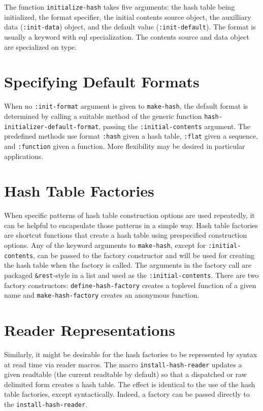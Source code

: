 \documentclass[11pt]{article}
\begin{document}
  The function \texttt{initialize-hash} takes five arguments: the hash table being
  initialized, the format specifier, the initial contents source object, the
  auxilliary data (\texttt{:init-data}) object, and the default value (\texttt{:init-default}).
  The format is usually a keyword with eql specialization. The contents
  source and data object are specialized on type.
\section{Specifying Default Formats}
\label{sec-6}


  When no \texttt{:init-format} argument is given to \texttt{make-hash}, the default format
  is determined by calling a suitable method of the generic function
  \texttt{hash-initializer-default-format}, passing the \texttt{:initial-contents} argument.
  The predefined methods use format \texttt{:hash} given a hash table, \texttt{:flat} given
  a sequence, and \texttt{:function} given a function. More flexibility may be
  desired in particular applications.
\section{Hash Table Factories}
\label{sec-7}


  When specific patterns of hash table construction options are used repeatedly,
  it can be helpful to encapsulate those patterns in a simple way.
  Hash table factories are shortcut functions that create a hash table using
  prespecified construction options. Any of the keyword arguments to \texttt{make-hash},
  except for \texttt{:initial-contents}, can be passed to the factory constructor
  and will be used for creating the hash table when the factory is called.
  The arguments in the factory call are packaged \texttt{\&rest}-style in a list
  and used as the \texttt{:initial-contents}. There are two factory constructors:
  \texttt{define-hash-factory} creates a toplevel function of a given name
  and \texttt{make-hash-factory} creates an anonymous function.
\section{Reader Representations}
\label{sec-8}


  Similarly, it might be desirable for the hash factories to be represented
  by syntax at read time via reader macros. The macro \texttt{install-hash-reader}
  updates a given readtable (the current readtable by default) so that
  a dispatched or raw delimited form creates a hash table. The effect
  is identical to the use of the hash table factories, except syntactically.
  Indeed, a factory can be passed directly to the \texttt{install-hash-reader}.
\end{document}
